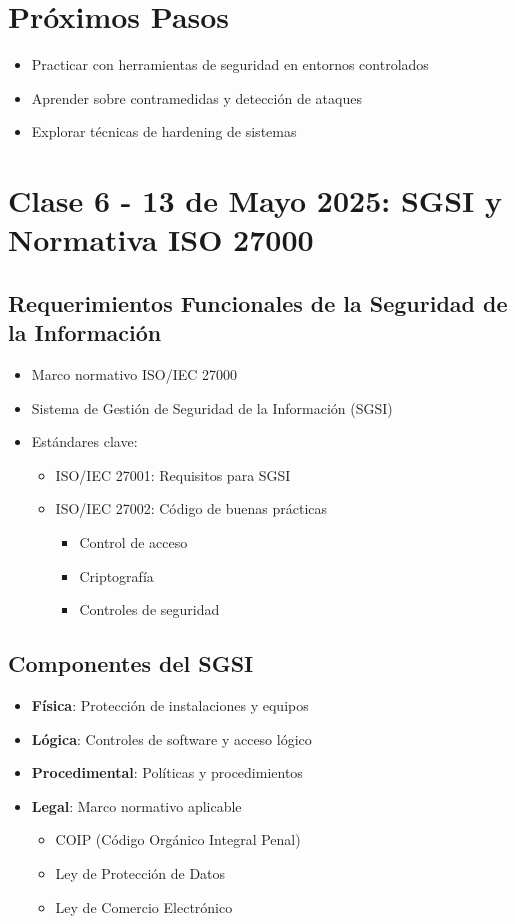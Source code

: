 \documentclass[12pt,a4paper]{article}
\begin{document}
\section{Próximos Pasos}
\begin{itemize}
    \item Practicar con herramientas de seguridad en entornos controlados
    \item Aprender sobre contramedidas y detección de ataques
    \item Explorar técnicas de hardening de sistemas
\end{itemize}

\section{Clase 6 - 13 de Mayo 2025: SGSI y Normativa ISO 27000}
\subsection{Requerimientos Funcionales de la Seguridad de la Información}
\begin{itemize}
    \item Marco normativo ISO/IEC 27000
    \item Sistema de Gestión de Seguridad de la Información (SGSI)
    \item Estándares clave:
    \begin{itemize}
        \item ISO/IEC 27001: Requisitos para SGSI
        \item ISO/IEC 27002: Código de buenas prácticas
        \begin{itemize}
            \item Control de acceso
            \item Criptografía
            \item Controles de seguridad
        \end{itemize}
    \end{itemize}
\end{itemize}

\subsection{Componentes del SGSI}
\begin{itemize}
    \item \textbf{Física}: Protección de instalaciones y equipos
    \item \textbf{Lógica}: Controles de software y acceso lógico
    \item \textbf{Procedimental}: Políticas y procedimientos
    \item \textbf{Legal}: Marco normativo aplicable
    \begin{itemize}
        \item COIP (Código Orgánico Integral Penal)
        \item Ley de Protección de Datos
        \item Ley de Comercio Electrónico
    \end{itemize}
\end{itemize}
\end{document}
